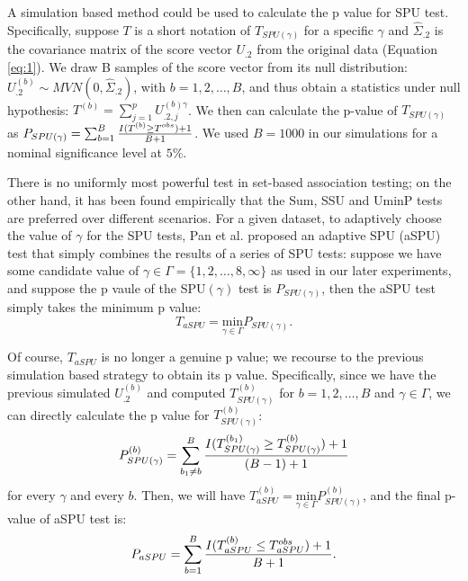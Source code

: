\documentclass[12pt]{article}
\begin{document}
A simulation based method \cite{Lin2005,Seaman2005} could be used to calculate the p value for SPU test. Specifically, suppose $T$ is a short notation of $T_{ SPU(\gamma) }$ for a specific $\gamma$ and $\hat{\Sigma}_{.2}$ is the covariance matrix of the score vector $U_{.2}$ from the original data (Equation \ref{eq:1}). We draw B samples of the score vector from its null distribution: $U_{.2}^{ (b) } \sim MVN \left( 0, \hat{\Sigma}_{.2} \right)$, with $b = 1,2,\ldots,B$, and thus obtain a statistics under null hypothesis: $T ^ {(b)} = \sum_{j=1}^p U^{ (b)\gamma }_{.2, j} $. We then can calculate the p-value of $T_{ SPU(\gamma) }$ as $P_{ SPU(\gamma) } = \sum_{b=1}^B { I(T^{(b)} \geq T ^ {obs} ) + 1  \over B + 1 } $. We used $B = 1000$ in our simulations for a nominal significance level at $5\%$. 

There is no uniformly most powerful test in set-based association testing; on the other hand, it has been found empirically that the Sum, SSU and UminP tests are preferred over different scenarios. For a given dataset, to adaptively choose the value of $\gamma$ for the SPU tests, Pan et al. \cite{pan2014powerful} proposed an adaptive SPU (aSPU) test that simply combines the results of a series of SPU tests: suppose we have some candidate value of $\gamma \in \Gamma = \{1,2,\ldots,8,\infty \}$ as used in our later experiments, and suppose the p vaule of the SPU$(\gamma)$ test is $P_{ SPU(\gamma) }$, then the aSPU test simply takes the minimum p value: 
$$
T_{aSPU} = \underset{\gamma\in\Gamma}{ \textrm{min} } P_{ SPU(\gamma) }.
$$

Of course, $T_{aSPU}$ is no longer a genuine p value; we recourse to the previous simulation based strategy to obtain its p value. Specifically, since we have the previous simulated $U_{.2}^{ (b) }$ and computed $T^{ (b) }_{ SPU(\gamma) }$ for $b = 1,2,\ldots,B$ and $\gamma \in \Gamma$, we can directly calculate the p value for $T ^ { (b) }_{ SPU(\gamma) }$:
$$
P^{ (b) }_{ SPU(\gamma) } =  \sum_{b_1 \neq b}^B { I(T^{ (b_1) }_{ SPU(\gamma) } \geq T^{ (b) }_{ SPU(\gamma) } ) + 1  \over (B-1) + 1 } 
$$
for every $\gamma$ and every $b$. Then, we will have $ 
T ^ {(b)} _{aSPU} = \underset{\gamma\in\Gamma}{ \textrm{min} } P^{ (b) }_{ SPU(\gamma) }
$, and the final p-value of aSPU test is:
$$
P_{aSPU} = \sum_{b=1}^B { I(T ^ {(b)} _{aSPU} \leq T ^ {obs} _{aSPU} ) + 1  \over B + 1 }.
$$
\end{document}
